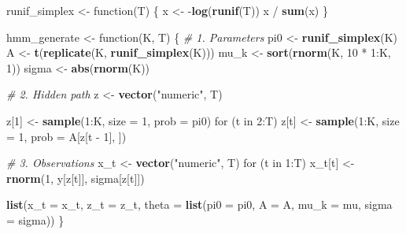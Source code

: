 \documentclass[]{article}
\newenvironment{Shaded}{\begin{snugshade}}{\end{snugshade}}
\newcommand{\KeywordTok}[1]{\textcolor[rgb]{0.13,0.29,0.53}{\textbf{{#1}}}}
\newcommand{\DataTypeTok}[1]{\textcolor[rgb]{0.13,0.29,0.53}{{#1}}}
\newcommand{\DecValTok}[1]{\textcolor[rgb]{0.00,0.00,0.81}{{#1}}}
\newcommand{\StringTok}[1]{\textcolor[rgb]{0.31,0.60,0.02}{{#1}}}
\newcommand{\CommentTok}[1]{\textcolor[rgb]{0.56,0.35,0.01}{\textit{{#1}}}}
\newcommand{\NormalTok}[1]{{#1}}
\begin{document}
\begin{Shaded}
\begin{Highlighting}[]
\NormalTok{runif_simplex <-}\StringTok{ }\NormalTok{function(T) \{}
  \NormalTok{x <-}\StringTok{ }\NormalTok{-}\KeywordTok{log}\NormalTok{(}\KeywordTok{runif}\NormalTok{(T))}
  \NormalTok{x /}\StringTok{ }\KeywordTok{sum}\NormalTok{(x)}
\NormalTok{\}}

\NormalTok{hmm_generate <-}\StringTok{ }\NormalTok{function(K, T) \{}
  \CommentTok{# 1. Parameters}
  \NormalTok{pi0 <-}\StringTok{ }\KeywordTok{runif_simplex}\NormalTok{(K)}
  \NormalTok{A <-}\StringTok{ }\KeywordTok{t}\NormalTok{(}\KeywordTok{replicate}\NormalTok{(K, }\KeywordTok{runif_simplex}\NormalTok{(K)))}
  \NormalTok{mu_k <-}\StringTok{ }\KeywordTok{sort}\NormalTok{(}\KeywordTok{rnorm}\NormalTok{(K, }\DecValTok{10} \NormalTok{*}\StringTok{ }\DecValTok{1}\NormalTok{:K, }\DecValTok{1}\NormalTok{))}
  \NormalTok{sigma <-}\StringTok{ }\KeywordTok{abs}\NormalTok{(}\KeywordTok{rnorm}\NormalTok{(K))}

  \CommentTok{# 2. Hidden path}
  \NormalTok{z <-}\StringTok{ }\KeywordTok{vector}\NormalTok{(}\StringTok{"numeric"}\NormalTok{, T)}

  \NormalTok{z[}\DecValTok{1}\NormalTok{] <-}\StringTok{ }\KeywordTok{sample}\NormalTok{(}\DecValTok{1}\NormalTok{:K, }\DataTypeTok{size =} \DecValTok{1}\NormalTok{, }\DataTypeTok{prob =} \NormalTok{pi0)}
  \NormalTok{for (t in }\DecValTok{2}\NormalTok{:T)}
    \NormalTok{z[t] <-}\StringTok{ }\KeywordTok{sample}\NormalTok{(}\DecValTok{1}\NormalTok{:K, }\DataTypeTok{size =} \DecValTok{1}\NormalTok{, }\DataTypeTok{prob =} \NormalTok{A[z[t -}\StringTok{ }\DecValTok{1}\NormalTok{], ])}

  \CommentTok{# 3. Observations}
  \NormalTok{x_t <-}\StringTok{ }\KeywordTok{vector}\NormalTok{(}\StringTok{"numeric"}\NormalTok{, T)}
  \NormalTok{for (t in }\DecValTok{1}\NormalTok{:T)}
    \NormalTok{x_t[t] <-}\StringTok{ }\KeywordTok{rnorm}\NormalTok{(}\DecValTok{1}\NormalTok{, y[z[t]], sigma[z[t]])}

  \KeywordTok{list}\NormalTok{(}\DataTypeTok{x_t =} \NormalTok{x_t, }\DataTypeTok{z_t =} \NormalTok{z_t,}
       \DataTypeTok{theta =} \KeywordTok{list}\NormalTok{(}\DataTypeTok{pi0 =} \NormalTok{pi0, }\DataTypeTok{A =} \NormalTok{A,}
                    \DataTypeTok{mu_k =} \NormalTok{mu, }\DataTypeTok{sigma =} \NormalTok{sigma))}
\NormalTok{\}}
\end{Highlighting}
\end{Shaded}
\end{document}
